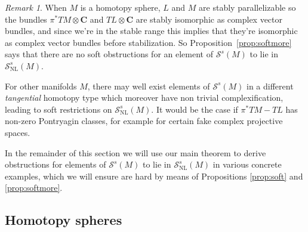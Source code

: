 \documentclass[reqno]{amsart}
\theoremstyle{theorem}
\newtheorem{corollary}{Corollary}[section]
\theoremstyle{remark}
\newtheorem{remark}[corollary]{Remark}
\theoremstyle{definition}
\newcommand{\NL}{\mathrm{NL}}
\newcommand{\C}{\mathbf{C}}
\renewcommand{\SS}{\mathcal{S}}
\begin{document}
\begin{remark}\label{rem: is soft?}
When $M$ is a homotopy sphere, $L$ and $M$ are stably parallelizable \cite{KM} so the bundles $\pi^*TM\otimes \C$ and $TL\otimes \C$
are stably isomorphic as complex vector bundles, and since we're in the stable range this implies that they're isomorphic as complex vector bundles before stabilization.
So Proposition~\ref{prop:softmore} says that there are no soft obstructions for an element of $\SS^s(M)$ to lie in $\SS^s_\NL(M)$.


For other manifolds $M$, there may well exist elements of $\SS^s(M)$ in a different
\emph{tangential} homotopy type which moreover have non trivial complexification,
leading to soft restrictions on $\SS^s_\NL(M)$. It would be the case if $\pi^*TM - TL$
has non-zero Pontryagin classes, for example for certain fake complex projective spaces.\end{remark}


In the remainder of this section we will use our main theorem to derive obstructions for elements of $\SS^s(M)$ to lie in $\SS^s_\NL(M)$ in various concrete examples, which we will ensure are hard by means of Propositions \ref{prop:soft} and \ref{prop:softmore}.










\subsection{Homotopy spheres}\label{sec: htpy spheres}




\end{document}
